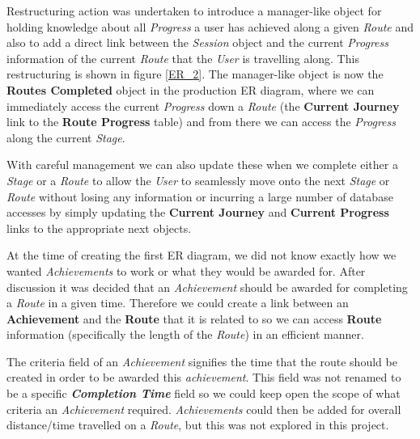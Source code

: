 Restructuring action was undertaken to introduce a manager-like object
for holding knowledge about all \emph{Progress} a user has achieved
along a given \emph{Route} and also to add a direct link between the
\emph{Session} object and the current \emph{Progress} information of
the current \emph{Route} that the \emph{User} is travelling
along. This restructuring is shown in figure \ref{ER_2}. The
manager-like object is now the \textbf{Routes Completed} object in the
production ER diagram, where we can immediately access the current
\emph{Progress} down a \emph{Route} (the \textbf{Current Journey} link
to the \textbf{Route Progress} table) and from there we can access the
\emph{Progress} along the current \emph{Stage}. 

With careful management we can also update these when we complete
either a \emph{Stage} or a \emph{Route} to allow the \emph{User} to
seamlessly move onto the next \emph{Stage} or \emph{Route} without
losing any information or incurring a large number of database
accesses by simply updating the \textbf{Current Journey} and
\textbf{Current Progress} links to the appropriate next objects. 

At the time of creating the first ER diagram, we did not know exactly
how we wanted \emph{Achievements} to work or what they would be
awarded for. After discussion it was decided that an
\emph{Achievement} should be awarded for completing a \emph{Route} in
a given time. Therefore we could create a link between an
\textbf{Achievement} and the \textbf{Route} that it is related to so
we can access \textbf{Route} information (specifically the length of the 
\emph{Route}) in an efficient manner. 

The criteria field of an \emph{Achievement} signifies the time that
the route should be created in order to be awarded this
\emph{achievement}. This field was not renamed to be a specific
\textbf{\textit{Completion Time}} field so we could keep open the
scope of what criteria an \emph{Achievement}
required. \emph{Achievements} could then be added for overall
distance/time travelled on a \emph{Route}, but this was not explored
in this project.  

